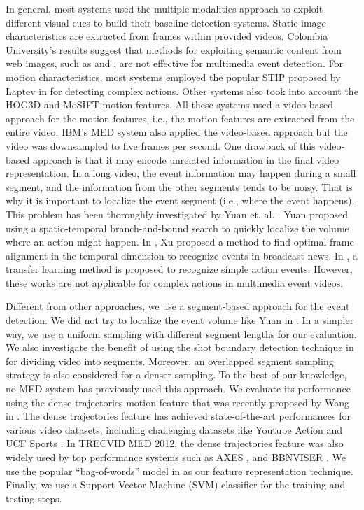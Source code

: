 In general, most systems used the multiple modalities approach to exploit different visual cues to build their baseline detection systems. Static image characteristics are extracted from frames within provided videos. Colombia University's results \cite{trecvid10:cuucf} suggest that methods for exploiting semantic content from web images, such as \cite{duan2012exploiting} and \cite{trecvid10:cuucf}, are not effective for multimedia event detection. For motion characteristics, most systems employed the popular STIP proposed by Laptev in \cite{Laptev:2005:SIP} for detecting complex actions. Other systems also took into account the HOG3D \cite{Klaser08BMVC} and MoSIFT \cite{Chen_mosift} motion features. All these systems used a video-based approach for the motion features, i.e., the motion features are extracted from the entire video. IBM's MED system \cite{trecvid10:IBM} also applied the video-based approach but the video was downsampled to five frames per second. One drawback of this video-based approach is that it may encode unrelated information in the final video representation. In a long video, the event information may happen during a small segment, and the information from the other segments tends to be noisy. That is why it is important to localize the event segment (i.e., where the event happens). This problem has been thoroughly investigated by Yuan et. al. \cite{Yuan2011PAMI}. Yuan proposed using a spatio-temporal branch-and-bound search to quickly localize the volume where an action might happen. In \cite{xu2008video}, Xu proposed a method to find optimal frame alignment in the
temporal dimension to recognize events in broadcast news. In \cite{duan2012visual}, a transfer learning method is proposed to recognize simple action events. However, these works are not applicable for complex actions in multimedia event videos.

Different from other approaches, we use a segment-based approach for the event detection. We did not try to localize the event volume like Yuan in \cite{Yuan2011PAMI}. In a simpler way, we use a uniform sampling with different segment lengths for our evaluation. We also investigate the benefit of using the shot boundary detection technique in \cite{Guimaraes:2003} for dividing video into segments. Moreover, an overlapped segment sampling strategy is also considered for a denser sampling. To the best of our knowledge, no MED system has previously used this approach. We evaluate its performance using the dense trajectories motion feature that was recently proposed by Wang in \cite{wang:2011:inria-00583818:1}. The dense trajectories feature has achieved state-of-the-art performances for various video datasets, including challenging datasets like Youtube Action \cite{liu2009recognizing} and UCF Sports \cite{Rodriguez2008}. In TRECVID MED 2012, the dense trajectories feature was also widely used by top performance systems such as AXES \cite{oneata:hal-00746874}, and BBNVISER \cite{NIST-TRECVID12:BBN-DVMM}. We use the popular ``bag-of-words'' model in \cite{Csurka04visualcategorization} as our feature representation technique. Finally, we use a Support Vector Machine (SVM) classifier for the training and testing steps. 

